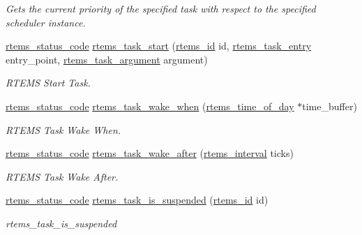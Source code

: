 \begin{DoxyCompactItemize}
\begin{DoxyCompactList}\small\item\em Gets the current priority of the specified task with respect to the specified scheduler instance. \end{DoxyCompactList}\item 
\mbox{\hyperlink{group__ClassicStatus_ga545d41846817eaba6143d52ee4d9e9fe}{rtems\+\_\+status\+\_\+code}} \mbox{\hyperlink{group__ClassicTasks_gac7fe1362154946d78978ceb4f116f13e}{rtems\+\_\+task\+\_\+start}} (\mbox{\hyperlink{group__ClassicTasks_gab20892b814dced7dd4e5b9bf42becd57}{rtems\+\_\+id}} id, \mbox{\hyperlink{group__ClassicTasks_ga3232e2350ecd8d85855ab1f6ec186828}{rtems\+\_\+task\+\_\+entry}} entry\+\_\+point, \mbox{\hyperlink{group__ClassicTasks_gaf202f985ef5a3156f29eae99a0536842}{rtems\+\_\+task\+\_\+argument}} argument)
\begin{DoxyCompactList}\small\item\em R\+T\+E\+MS Start Task. \end{DoxyCompactList}\item 
\mbox{\hyperlink{group__ClassicStatus_ga545d41846817eaba6143d52ee4d9e9fe}{rtems\+\_\+status\+\_\+code}} \mbox{\hyperlink{group__ClassicTasks_gad5c419525564142bcd1f116b18c4ed7c}{rtems\+\_\+task\+\_\+wake\+\_\+when}} (\mbox{\hyperlink{structrtems__time__of__day}{rtems\+\_\+time\+\_\+of\+\_\+day}} $\ast$time\+\_\+buffer)
\begin{DoxyCompactList}\small\item\em R\+T\+E\+MS Task Wake When. \end{DoxyCompactList}\item 
\mbox{\hyperlink{group__ClassicStatus_ga545d41846817eaba6143d52ee4d9e9fe}{rtems\+\_\+status\+\_\+code}} \mbox{\hyperlink{group__ClassicTasks_ga69becc1811a7654b0b74836272ac6429}{rtems\+\_\+task\+\_\+wake\+\_\+after}} (\mbox{\hyperlink{group__ClassicTasks_gad39c43f949683d46874e3a5586b93aee}{rtems\+\_\+interval}} ticks)
\begin{DoxyCompactList}\small\item\em R\+T\+E\+MS Task Wake After. \end{DoxyCompactList}\item 
\mbox{\hyperlink{group__ClassicStatus_ga545d41846817eaba6143d52ee4d9e9fe}{rtems\+\_\+status\+\_\+code}} \mbox{\hyperlink{group__ClassicTasks_ga626e860edc5525db9f87de63efe14661}{rtems\+\_\+task\+\_\+is\+\_\+suspended}} (\mbox{\hyperlink{group__ClassicTasks_gab20892b814dced7dd4e5b9bf42becd57}{rtems\+\_\+id}} id)
\begin{DoxyCompactList}\small\item\em rtems\+\_\+task\+\_\+is\+\_\+suspended \end{DoxyCompactList}\item 

\end{DoxyCompactItemize}
